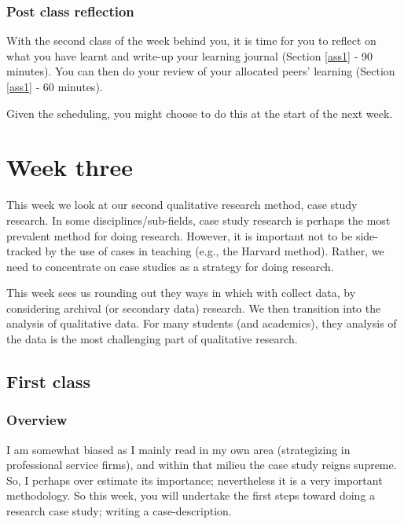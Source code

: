 \documentclass[]{book}
\theoremstyle{definition}
\theoremstyle{definition}
\theoremstyle{definition}
\theoremstyle{remark}
\begin{document}
\hypertarget{post-class-reflection-3}{%
\subsection*{Post class reflection}\label{post-class-reflection-3}}

With the second class of the week behind you, it is time for you to
reflect on what you have learnt and write-up your learning journal
(Section \ref{ass1} ‐ 90 minutes). You can then do your review of your
allocated peers' learning (Section \ref{ass1} ‐ 60 minutes).

Given the scheduling, you might choose to do this at the start of the
next week.

\hypertarget{w3-details}{%
\chapter{Week three}\label{w3-details}}

This week we look at our second qualitative research method, case study
research. In some disciplines/sub-fields, case study research is perhaps
the most prevalent method for doing research. However, it is important
not to be side-tracked by the use of cases in teaching (e.g., the
Harvard method). Rather, we need to concentrate on case studies as a
strategy for doing research.

This week sees us rounding out they ways in which with collect data, by
considering archival (or secondary data) research. We then transition
into the analysis of qualitative data. For many students (and
academics), they analysis of the data is the most challenging part of
qualitative research.

\hypertarget{first-class-2}{%
\section*{First class}\label{first-class-2}}

\hypertarget{overview-4}{%
\subsection*{Overview}\label{overview-4}}

I am somewhat biased as I mainly read in my own area (strategizing in
professional service firms), and within that milieu the case study
reigns supreme. So, I perhaps over estimate its importance; nevertheless
it is a very important methodology. So this week, you will undertake the
first steps toward doing a research case study; writing a
case-description.
\end{document}
